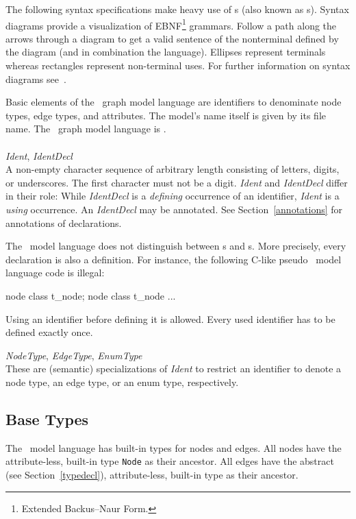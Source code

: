 \begin{note}
The following syntax specifications make heavy use of s (also known as s).
Syntax diagrams provide a visualization of EBNF\footnote{Extended Backus–Naur Form.} grammars.
Follow a path along the arrows through a diagram to get a valid sentence of the nonterminal defined by the diagram (and in combination the language).
Ellipses represent terminals whereas rectangles represent non-terminal uses.
For further information on syntax diagrams see~\cite{MMJW:91}.
\end{note}
Basic elements of the \GrG\ graph model language are identifiers to denominate node types, edge types, and attributes.
The model's name itself is given by its file name.
The \GrG\ graph model language is .\\
\\
\emph{Ident}, \emph{IdentDecl}\\ \nopagebreak
A non-empty character sequence of arbitrary length consisting of letters, digits, or underscores.
The first character must not be a digit. \emph{Ident} and \emph{IdentDecl} differ in their role:
While \emph{IdentDecl} is a \emph{defining} occurrence of an identifier, \emph{Ident} is a \emph{using} occurrence.
An \emph{IdentDecl} may be annotated. See Section~\ref{annotations} for annotations of declarations.
\begin{note}
\label{note:modeldecl}
  The \GrG\ model language does not distinguish between s and s. More precisely, every declaration is also a definition. For instance, the following C-like pseudo \GrG\ model language code is illegal:
\begin{grgen}
node class t_node;
node class t_node {
  ...
}
\end{grgen}
Using an identifier before defining it is allowed. Every used identifier has to be defined exactly once.
\end{note}
\emph{NodeType}, \emph{EdgeType}, \emph{EnumType}\\ %
These are (semantic) specializations of \emph{Ident} to restrict an identifier to denote a node type, an edge type, or an enum type, respectively.

\subsection{Base Types}
\label{sct:basetypes}
The \GrG\ model language has built-in types for nodes and edges.
All nodes have the attribute-less, built-in type \texttt{Node} as their ancestor.
All edges have the abstract (see Section~\ref{typedecl}), attribute-less, built-in type \texttt{} as their ancestor.

